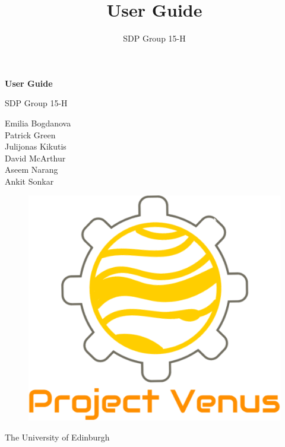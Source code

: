 \documentclass[a4paper,12pt]{article}
\title{User Guide}
\author{SDP Group 15-H}
\begin{document}
\begin{titlepage}
    \begin{center}
        \vspace*{1cm}
        
        \Huge
        \textbf{User Guide}
        
        \vspace{0.5cm}
        \LARGE
        SDP Group 15-H
        
        \vspace{1.5cm}
        \normalsize
		Emilia Bogdanova\\
		Patrick Green\\
        Julijonas Kikutis\\ 
		David McArthur\\
		Aseem Narang\\
		Ankit Sonkar\\
        
        \vfill
        
        
        \vspace{0.8cm}
        
        \begin{figure}
    	\vspace*{-2.5em}
    	\centering
    	\includegraphics[scale=.30]{logo.png}
		\end{figure}
        
        \Large
        The University of Edinburgh\\
        
    \end{center}
\end{titlepage}
\end{document}
